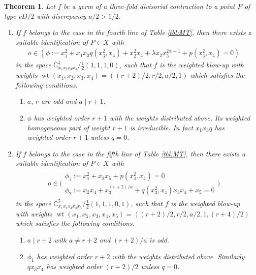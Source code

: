 \documentclass[a4paper,11pt]{amsart}
\newtheorem{theorem}{Theorem}[section]
\theoremstyle{definition}
\theoremstyle{remark}
\numberwithin{equation}{section}
\newcommand{\bC}{{\mathbb C}}
\newcommand{\wt}{\operatorname{wt}}
\begin{document}
\begin{theorem}\label{thm:cD/2}
Let $f$ be a germ of a three-fold divisorial contraction
to a point $P$ of type c$D/2$ with discrepancy $a/2>1/2$.
\begin{enumerate}
\item\label{itm:cD/2_2}
If $f$ belongs to the case in the fourth line of Table \textup{\ref{tbl:MT}},
then there exists a suitable identification of $P \in X$ with
\begin{align*}
o \in (\phi:=x_1^2+x_1x_3q(x_3^2,x_4)+x_2^2x_4+\lambda x_2x_3^{2\alpha-1}
+p(x_3^2,x_4)=0)
\end{align*}
in the space $\bC^4_{x_1x_2x_3x_4}/\frac{1}{2}(1,1,1,0)$,
such that $f$ is the weighted blow-up with weights
$\wt(x_1,x_2,x_3,x_4)=((r+2)/2,r/2,a/2,1)$
which satisfies the following conditions.
\begin{enumerate}
\item
$a$, $r$ are odd and $a \mid r+1$.
\item
$\phi$ has weighted order $r+1$ with the weights distributed above.
Its weighted homogeneous part of weight $r+1$ is irreducible.
In fact $x_1x_3q$ has weighted order $r+1$ unless $q=0$.
\end{enumerate}
\item\label{itm:cD/2_4}
If $f$ belongs to the case in the fifth line of Table \textup{\ref{tbl:MT}},
then there exists a suitable identification of $P \in X$ with
\begin{align*}
o \in \bigg(
\begin{array}{c}
\phi_1:=x_1^2+x_2x_5+p(x_3^2,x_4)=0 \\
\phi_2:=x_2x_4+x_3^{(r+2)/a}+q(x_3^2,x_4)x_3x_4+x_5=0
\end{array}
\bigg)
\end{align*}
in the space $\bC^5_{x_1x_2x_3x_4x_5}/\frac{1}{2}(1,1,1,0,1)$,
such that $f$ is the weighted blow-up with weights
$\wt(x_1,x_2,x_3,x_4,x_5)=((r+2)/2,r/2,a/2,1,(r+4)/2)$
which satisfies the following conditions.
\begin{enumerate}
\item
$a \mid r+2$ with $a\neq r+2$ and $(r+2)/a$ is odd.
\item
$\phi_1$ has weighted order $r+2$ with the weights distributed above.
Similarly $qx_3x_4$ has weighted order $(r+2)/2$ unless $q=0$.
\end{enumerate}
\end{enumerate}
\end{theorem}
\end{document}
